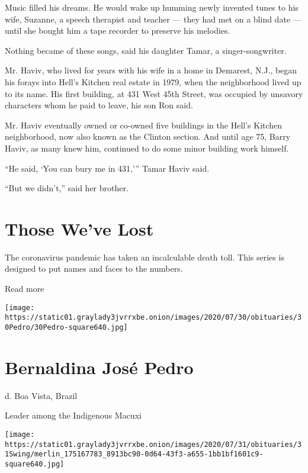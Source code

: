 Music filled his dreams. He would wake up humming newly invented tunes
to his wife, Suzanne, a speech therapist and teacher --- they had met on
a blind date --- until she bought him a tape recorder to preserve his
melodies.

Nothing became of these songs, said his daughter Tamar, a
singer-songwriter.

Mr. Haviv, who lived for years with his wife in a home in Demarest,
N.J., began his forays into Hell's Kitchen real estate in 1979, when the
neighborhood lived up to its name. His first building, at 431 West 45th
Street, was occupied by unsavory characters whom he paid to leave, his
son Ron said.

Mr. Haviv eventually owned or co-owned five buildings in the Hell's
Kitchen neighborhood, now also known as the Clinton section. And until
age 75, Barry Haviv, as many knew him, continued to do some minor
building work himself.

``He said, `You can bury me in 431,''' Tamar Haviv said.

``But we didn't,'' said her brother.

\href{https://www.nytimes3xbfgragh.onion/interactive/2020/obituaries/people-died-coronavirus-obituaries.html?action=click\&pgtype=Article\&state=default\&region=BELOW_MAIN_CONTENT\&context=covid_obits_promo}{}

\hypertarget{those-weve-lost}{%
\section{Those We've Lost}\label{those-weve-lost}}

The coronavirus pandemic has taken an incalculable death toll. This
series is designed to put names and faces to the numbers.

Read more

\texttt{[image: https://static01.graylady3jvrrxbe.onion/images/2020/07/30/obituaries/30Pedro/30Pedro-square640.jpg]}

\hypertarget{bernaldina-josuxe9-pedro}{%
\section{Bernaldina José Pedro}\label{bernaldina-josuxe9-pedro}}

d. Boa Vista, Brazil

Leader among the Indigenous Macuxi

\texttt{[image: https://static01.graylady3jvrrxbe.onion/images/2020/07/31/obituaries/31Swing/merlin\_175167783\_8913bc90-0d64-43f3-a655-1bb1bf1601c9-square640.jpg]}

